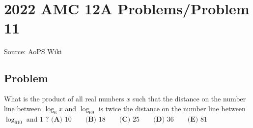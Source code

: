 \documentclass[12pt]{article}
\begin{document}
\section*{{2022 AMC 12A Problems/Problem 11}}
Source: AoPS Wiki

\subsection*{Problem}
What is the product of all real numbers $x$ such that the distance on the number line between $\log_6x$ and $\log_69$ is twice the distance on the number line between $\log_610$ and $1$ ? $\textbf{(A) } 10 \qquad \textbf{(B) } 18 \qquad \textbf{(C) } 25 \qquad \textbf{(D) } 36 \qquad \textbf{(E) } 81$
\end{document}
